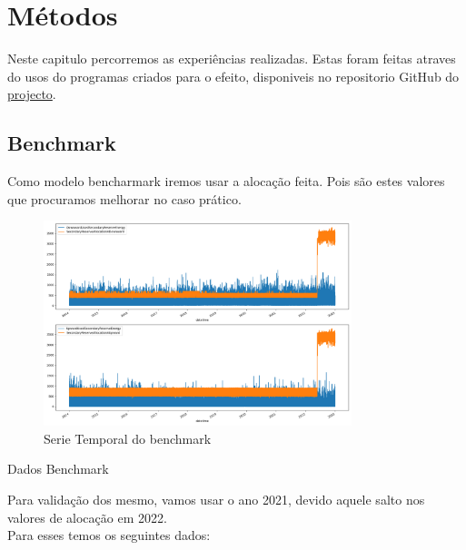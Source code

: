 \chapter{Métodos}

Neste capitulo percorremos as experiências realizadas. Estas foram feitas atraves do usos do programas criados para o efeito, disponiveis no repositorio GitHub do \href{https://github.com/JotaFan/renewable-generation-into-reserve-markets}{projecto}.\\

\section{Benchmark}

Como modelo bencharmark iremos usar a alocação feita. Pois são estes valores que procuramos melhorar no caso prático.\\



\begin{figure}[H]
    \centering
    \includegraphics[width=0.8\textwidth]{../plots/benchmark.png}
    \caption{Serie Temporal do benchmark}
    \label{fig:benchmark}
\end{figure}
  

\begin{table}[H]
    \caption{Dados Benchmark}
\end{table}


Para validação dos mesmo, vamos usar o ano 2021, devido aquele salto nos valores de alocação em 2022.\\

Para esses temos os seguintes dados:

